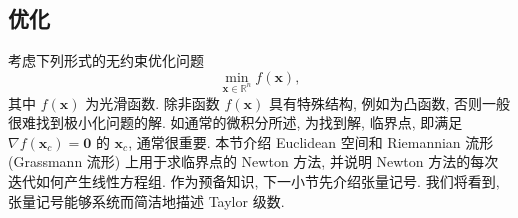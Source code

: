 \subsection{{优化}}\label{sec:optimization}
{考虑下列形式的无约束优化问题}
\begin{equation}\label{eq:unconstrained-minimization}
\min_{\boldsymbol{x}\in\mathbb{R}^n}f(\boldsymbol{x}),
\end{equation}
{其中 $f(\boldsymbol{x})$ 为光滑函数. 除非函数 $f(\boldsymbol{x})$ 具有特殊结构, 例如为凸函数, 否则一般很难找到极小化问题的解. 如通常的微积分所述, 为找到解, 临界点, 即满足 $\nabla f(\boldsymbol{x}_c)=\boldsymbol{0}$ 的 $\boldsymbol{x}_c$, 通常很重要.}
{本节介绍 Euclidean 空间和 Riemannian 流形 (Grassmann 流形) 上用于求临界点的 Newton 方法, 并说明 Newton 方法的每次迭代如何产生线性方程组. 作为预备知识, 下一小节先介绍张量记号. 我们将看到, 张量记号能够系统而简洁地描述 Taylor 级数.}

